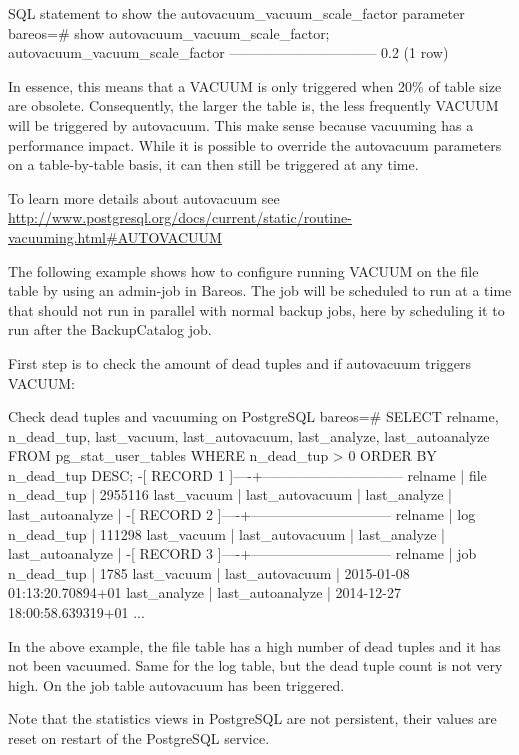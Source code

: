 \begin{commands}{SQL statement to show the autovacuum\_vacuum\_scale\_factor parameter}
bareos=# show autovacuum_vacuum_scale_factor;
 autovacuum_vacuum_scale_factor
 --------------------------------
  0.2
  (1 row)
\end{commands}

In essence, this means that a VACUUM is only triggered when 20\% of table size
are obsolete. Consequently, the larger the table is, the less frequently VACUUM
will be triggered by autovacuum. This make sense because vacuuming has a
performance impact. While it is possible to override the autovacuum parameters
on a table-by-table basis, it can then still be triggered at any time.

To learn more details about autovacuum see
\url{http://www.postgresql.org/docs/current/static/routine-vacuuming.html#AUTOVACUUM}

The following example shows how to configure running VACUUM on the file table by
using an admin-job in Bareos. The job will be scheduled to run at a time that should
not run in parallel with normal backup jobs, here by scheduling it to run after
the BackupCatalog job.

First step is to check the amount of dead tuples and if autovacuum triggers VACUUM:

\begin{commands}{Check dead tuples and vacuuming on PostgreSQL}
bareos=# SELECT relname, n_dead_tup, last_vacuum, last_autovacuum, last_analyze, last_autoanalyze
FROM pg_stat_user_tables WHERE n_dead_tup > 0 ORDER BY n_dead_tup DESC;
-[ RECORD 1 ]----+------------------------------
relname          | file
n_dead_tup       | 2955116
last_vacuum      |
last_autovacuum  |
last_analyze     |
last_autoanalyze |
-[ RECORD 2 ]----+------------------------------
relname          | log
n_dead_tup       | 111298
last_vacuum      |
last_autovacuum  |
last_analyze     |
last_autoanalyze |
-[ RECORD 3 ]----+------------------------------
relname          | job
n_dead_tup       | 1785
last_vacuum      |
last_autovacuum  | 2015-01-08 01:13:20.70894+01
last_analyze     |
last_autoanalyze | 2014-12-27 18:00:58.639319+01
...
\end{commands}

In the above example, the file table has a high number of dead tuples and it
has not been vacuumed. Same for the log table, but the dead tuple count is not
very high. On the job table autovacuum has been triggered.

Note that the statistics views in PostgreSQL are not persistent, their values
are reset on restart of the PostgreSQL service.

